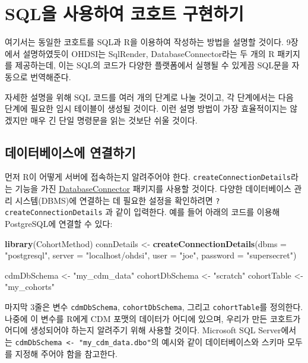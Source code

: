 \documentclass[10.5pt]{book}
\newenvironment{Shaded}{\begin{snugshade}}{\end{snugshade}}
\newcommand{\KeywordTok}[1]{\textcolor[rgb]{0.13,0.29,0.53}{\textbf{#1}}}
\newcommand{\DataTypeTok}[1]{\textcolor[rgb]{0.13,0.29,0.53}{#1}}
\newcommand{\StringTok}[1]{\textcolor[rgb]{0.31,0.60,0.02}{#1}}
\newcommand{\NormalTok}[1]{#1}
\theoremstyle{definition}
\theoremstyle{definition}
\theoremstyle{definition}
\theoremstyle{remark}
\begin{document}
\section{SQL을 사용하여 코호트 구현하기}\label{sql---}

여기서는 동일한 코호트를 SQL과 R을 이용하여 작성하는 방법을 설명할
것이다. 9장에서 설명하였듯이 OHDSI는 SqlRender, DatabaseConnector라는 두
개의 R 패키지를 제공하는데, 이는 SQL의 코드가 다양한 플랫폼에서 실행될
수 있게끔 SQL문을 자동으로 번역해준다.

자세한 설명을 위해 SQL 코드를 여러 개의 단계로 나눌 것이고, 각
단계에서는 다음 단계에 필요한 임시 테이블이 생성될 것이다. 이런 설명
방법이 가장 효율적이지는 않겠지만 매우 긴 단일 명령문을 읽는 것보단 쉬울
것이다.

\subsection{데이터베이스에 연결하기}\label{-}

먼저 R이 어떻게 서버에 접속하는지 알려주어야 한다.
\texttt{createConnectionDetails}라는 기능을 가진
\href{https://ohdsi.github.io/DatabaseConnector/}{DatabaseConnector}
패키지를 사용할 것이다. 다양한 데이터베이스 관리 시스템(DBMS)에 연결하는
데 필요한 설정을 확인하려면 \texttt{?createConnectionDetails} 과 같이
입력한다. 예를 들어 아래의 코드를 이용해 PostgreSQL에 연결할 수 있다:

\begin{Shaded}
\begin{Highlighting}[]
\KeywordTok{library}\NormalTok{(CohortMethod)}
\NormalTok{connDetails <-}\StringTok{ }\KeywordTok{createConnectionDetails}\NormalTok{(}\DataTypeTok{dbms =} \StringTok{"postgresql"}\NormalTok{,}
                                       \DataTypeTok{server =} \StringTok{"localhost/ohdsi"}\NormalTok{,}
                                       \DataTypeTok{user =} \StringTok{"joe"}\NormalTok{,}
                                       \DataTypeTok{password =} \StringTok{"supersecret"}\NormalTok{)}

\NormalTok{cdmDbSchema <-}\StringTok{ "my_cdm_data"}
\NormalTok{cohortDbSchema <-}\StringTok{ "scratch"}
\NormalTok{cohortTable <-}\StringTok{ "my_cohorts"}
\end{Highlighting}
\end{Shaded}

마지막 3줄은 변수 \texttt{cdmDbSchema}, \texttt{cohortDbSchema}, 그리고
\texttt{cohortTable}를 정의한다. 나중에 이 변수를 R에게 CDM 포맷의
데이터가 어디에 있으며, 우리가 만든 코호트가 어디에 생성되어야 하는지
알려주기 위해 사용할 것이다. Microsoft SQL Server에서는
\texttt{cdmDbSchema\ \textless{}-\ "my\_cdm\_data.dbo"}의 예시와 같이
데이터베이스와 스키마 모두를 지정해 주어야 함을 참고한다.
\end{document}
